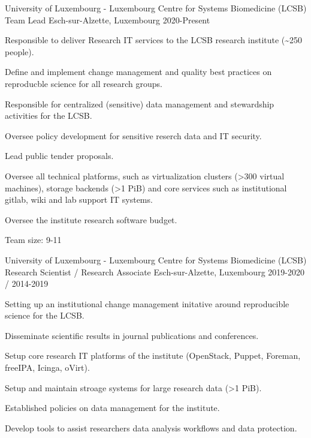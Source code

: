 \begin{cventries}
  \cventry
    {University of Luxembourg - Luxembourg Centre for Systems Biomedicine (LCSB)} %
    {Team Lead} %
    {Esch-sur-Alzette, Luxembourg} %
    {2020-Present} %
    {
      \begin{cvitems} %
        \item {Responsible to deliver Research IT services to the LCSB research institute (\textasciitilde 250 people).}
        \item {Define and implement change management and quality best practices on reproducble science for all research groups.}
        \item {Responsible for centralized (sensitive) data management and stewardship activities for the LCSB.}
        \item {Oversee policy development for sensitive reserch data and IT security.}
        \item {Lead public tender proposals.}
        \item {Oversee all technical platforms, such as virtualization clusters (\textgreater 300 virtual machines), storage backends (\textgreater 1 PiB) and core services such as institutional gitlab, wiki and lab support IT systems.}
        \item {Oversee the institute research software budget.}
        \item {Team size: 9-11}
      \end{cvitems}
    }

  \cventry
    {University of Luxembourg - Luxembourg Centre for Systems Biomedicine (LCSB)} %
    {Research Scientist / Research Associate} %
    {Esch-sur-Alzette, Luxembourg} %
    {2019-2020 / 2014-2019} %
    {
      \begin{cvitems} %
        \item {Setting up an institutional change management initative around reproducible science for the LCSB.}
        \item {Disseminate scientific results in journal publications and conferences.}
        \item {Setup core research IT platforms of the institute (OpenStack, Puppet, Foreman, freeIPA, Icinga, oVirt).}
        \item {Setup and maintain stroage systems for large research data (\textgreater 1 PiB).}
        \item {Established policies on data management for the institute.}
        \item {Develop tools to assist researchers data analysis workflows and data protection.}
      \end{cvitems}
    }


\end{cventries}
